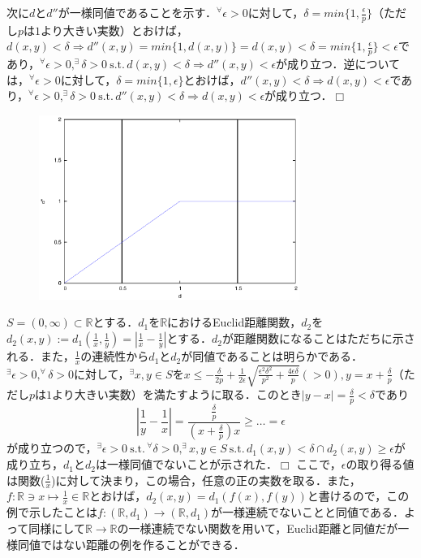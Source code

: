 ﻿\documentclass[11pt,a4paper]{jsarticle}
\newcommand{\st}{\mathrm{s.t.}\,}  %
\def\qed{\hfill $\Box$}
\begin{document}
次に$d$と$d''$が一様同値であることを示す．$^\forall \epsilon>0$に対して，$\delta=min\{1,\frac{\epsilon}{p}\}$（ただし$p$は$1$より大きい実数）とおけば，$d(x,y)<\delta \Rightarrow d''(x,y)=min\{1,d(x,y)\}=d(x,y)<\delta=min\{1,\frac{\epsilon}{p}\}<\epsilon$であり，$^\forall \epsilon>0, ^\exists \delta>0{\ } \st d(x,y)<\delta \Rightarrow d''(x,y)<\epsilon$が成り立つ．逆については，$^\forall \epsilon>0$に対して，$\delta=min\{1,\epsilon\}$とおけば，$d''(x,y)<\delta \Rightarrow d(x,y)<\epsilon$であり，$^\forall \epsilon>0, ^\exists \delta>0{\ } \st d''(x,y)<\delta \Rightarrow d(x,y)<\epsilon$が成り立つ．\qed
\begin{figure}[htbp]
 \begin{center}
  \includegraphics[width=85mm]{graph1.eps}
 \end{center}
\end{figure}
%
\prob
$S=(0,\infty) \subset \mathbb{R}$とする．$d_1$を$\mathbb{R}$におけるEuclid距離関数，$d_2$を$d_2(x,y):=d_1(\frac{1}{x},\frac{1}{y})=\left|\frac{1}{x}-\frac{1}{y}\right|$とする．$d_2$が距離関数になることはただちに示される．また，$\frac{1}{x}$の連続性から$d_1$と$d_2$が同値であることは明らかである．$^\exists \epsilon>0, ^\forall \delta>0$に対して，$^\exists x,y \in S$を$\displaystyle x \leq -\frac{\delta}{2p}+\frac{1}{2\epsilon}\sqrt{\frac{\epsilon^2\delta^2}{p^2}+\frac{4\epsilon\delta}{p}}(>0),y=x+\frac{\delta}{p}$（ただし$p$は$1$より大きい実数）を満たすように取る．このとき$|y-x|=\frac{\delta}{p}<\delta$であり
\begin{equation*}
\left| \frac{1}{y}-\frac{1}{x} \right|=\frac{\frac{\delta}{p}}{(x+\frac{\delta}{p})x} \geq …=\epsilon
\end{equation*}
が成り立つので，$^\exists\epsilon>0{\ }\st ^\forall\delta>0, ^\exists x,y \in S {\ }\st d_1(x,y)<\delta \cap d_2(x,y) \geq \epsilon$が成り立ち，$d_1$と$d_2$は一様同値でないことが示された．\qed
\supple
ここで，$\epsilon$の取り得る値は関数($\frac{1}{x}$)に対して決まり，この場合，任意の正の実数を取る．また，$f:\mathbb{R} \ni x \mapsto \frac{1}{x} \in \mathbb{R}$とおけば，$d_2(x,y)=d_1(f(x),f(y))$と書けるので，この例で示したことは$f:(\mathbb{R},d_1) \to (\mathbb{R},d_1)$が一様連続でないことと同値である．よって同様にして$\mathbb{R} \to \mathbb{R}$の一様連続でない関数を用いて，Euclid距離と同値だが一様同値ではない距離の例を作ることができる．
\end{document}
